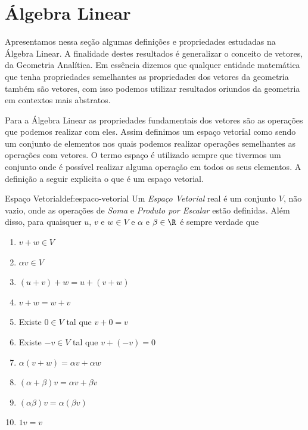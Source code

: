 \section{Álgebra Linear}
\label{sec:Algebra_Linear}

Apresentamos nessa seção algumas definições e propriedades estudadas na Álgebra Linear.
A finalidade destes resultados é generalizar o conceito de vetores, da Geometria Analítica.
Em essência dizemos que qualquer entidade matemática que tenha propriedades semelhantes as
propriedades dos vetores da geometria também são vetores, com isso podemos utilizar
resultados oriundos da geometria em contextos mais abstratos.

Para a Álgebra Linear as propriedades fundamentais dos vetores são as operações que
podemos realizar com eles. Assim definimos um espaço vetorial como sendo um conjunto
de elementos nos quais podemos realizar operações semelhantes as operações com vetores.
O termo espaço é utilizado sempre que tivermos um conjunto onde é possível
realizar alguma operação em todos os seus elementos. A definição a seguir explicita
o que é um espaço vetorial.

\begin{definicao}{Espaço Vetorial}{def:espaco-vetorial}
  Um \emph{Espaço Vetorial} real é um conjunto $V$,
  não vazio, onde as operações de \emph{Soma} e
  \emph{Produto por Escalar} estão definidas.
  Além disso, para quaisquer $u$, $v$ e $w\in V$ e $\alpha$ e $\beta\in\R$
  é sempre verdade que
  \begin{enumerate}
    \item \( v + w \in V \)
    \item \( \alpha v \in V \)
    \item \( (u+v) + w = u + (v+w)\)
    \item \( v+w = w+v \)
    \item Existe \( 0\in V\) tal que \(v+0=v\)
    \item Existe \(-v\in V\) tal que \(v+(-v) = 0\)
    \item \( \alpha(v+w) = \alpha v + \alpha w \)
    \item \((\alpha+\beta)v = \alpha v + \beta v \)
    \item \((\alpha \beta)v = \alpha(\beta v)\)
    \item \( 1v = v \)
  \end{enumerate}
\end{definicao}

